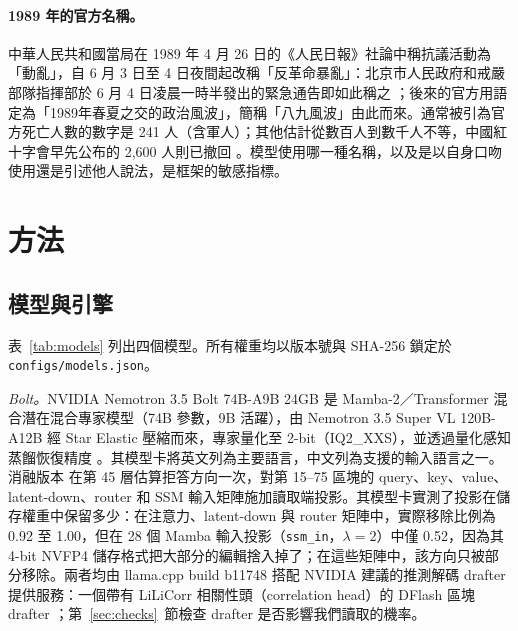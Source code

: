\documentclass[11pt,a4paper]{article}
\begin{document}
\paragraph{1989 年的官方名稱。}
中華人民共和國當局在 1989 年 4 月 26 日的《人民日報》社論中稱抗議活動為「動亂」\citep{pbs2006tankman}，自 6 月 3 日至 4 日夜間起改稱「反革命暴亂」：北京市人民政府和戒嚴部隊指揮部於 6 月 4 日凌晨一時半發出的緊急通告即如此稱之 \citep{xinhua1989notice}；後來的官方用語定為「1989年春夏之交的政治風波」，簡稱「八九風波」由此而來。通常被引為官方死亡人數的數字是 241 人（含軍人）；其他估計從數百人到數千人不等，中國紅十字會早先公布的 2,600 人則已撤回 \citep{pbs2006tankman}。模型使用哪一種名稱，以及是以自身口吻使用還是引述他人說法，是框架的敏感指標。

\section{方法}

\subsection{模型與引擎}\label{sec:models}

表~\ref{tab:models} 列出四個模型。所有權重均以版本號與 SHA-256 鎖定於 \texttt{configs/models.json}。

\emph{Bolt。}NVIDIA Nemotron 3.5 Bolt 74B-A9B 24GB \citep{nvidia2026bolt} 是 Mamba-2／Transformer 混合潛在混合專家模型（74B 參數，9B 活躍），由 Nemotron 3.5 Super VL 120B-A12B 經 Star Elastic \citep{taghibakhshi2026star} 壓縮而來，專家量化至 2-bit（IQ2\_XXS），並透過量化感知蒸餾恢復精度 \citep{xin2026qad}。其模型卡將英文列為主要語言，中文列為支援的輸入語言之一。消融版本 \citep{boldingbuilds2026} 在第 45 層估算拒答方向一次，對第 15--75 區塊的 query、key、value、latent-down、router 和 SSM 輸入矩陣施加讀取端投影。其模型卡實測了投影在儲存權重中保留多少：在注意力、latent-down 與 router 矩陣中，實際移除比例為 0.92 至 1.00，但在 28 個 Mamba 輸入投影（\texttt{ssm\_in}，$\lambda = 2$）中僅 0.52，因為其 4-bit NVFP4 儲存格式把大部分的編輯捨入掉了；在這些矩陣中，該方向只被部分移除。兩者均由 llama.cpp \citep{llamacpp} build b11748 搭配 NVIDIA 建議的推測解碼 drafter 提供服務：一個帶有 LiLiCorr 相關性頭（correlation head）的 DFlash 區塊 drafter \citep{rusanovsky2026lilicorr}；第~\ref{sec:checks}~節檢查 drafter 是否影響我們讀取的機率。
\end{document}
